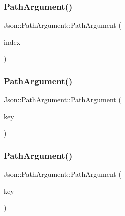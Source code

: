 \hypertarget{class_json_1_1_path_argument_a53c5b27143b161301b95fd544c139ecf}{}\label{class_json_1_1_path_argument_a53c5b27143b161301b95fd544c139ecf} 
\subsubsection{\texorpdfstring{Path\+Argument()}{PathArgument()}\hspace{0.1cm}{\footnotesize\ttfamily [6/8]}}
{\footnotesize\ttfamily Json\+::\+Path\+Argument\+::\+Path\+Argument (\begin{DoxyParamCaption}\item[{\hyperlink{namespace_json_a8048e741f2177c3b5d9ede4a5b8c53c2}{Array\+Index}}]{index }\end{DoxyParamCaption})}

\hypertarget{class_json_1_1_path_argument_a9690417a8a40e6e49f2acdf6c9281345}{}\label{class_json_1_1_path_argument_a9690417a8a40e6e49f2acdf6c9281345} 
\subsubsection{\texorpdfstring{Path\+Argument()}{PathArgument()}\hspace{0.1cm}{\footnotesize\ttfamily [7/8]}}
{\footnotesize\ttfamily Json\+::\+Path\+Argument\+::\+Path\+Argument (\begin{DoxyParamCaption}\item[{const char $\ast$}]{key }\end{DoxyParamCaption})}

\hypertarget{class_json_1_1_path_argument_ac15f25452124fbf21218897113015301}{}\label{class_json_1_1_path_argument_ac15f25452124fbf21218897113015301} 
\subsubsection{\texorpdfstring{Path\+Argument()}{PathArgument()}\hspace{0.1cm}{\footnotesize\ttfamily [8/8]}}
{\footnotesize\ttfamily Json\+::\+Path\+Argument\+::\+Path\+Argument (\begin{DoxyParamCaption}\item[{const \hyperlink{config_8h_a1e723f95759de062585bc4a8fd3fa4be}{J\+S\+O\+N\+C\+P\+P\+\_\+\+S\+T\+R\+I\+NG} \&}]{key }\end{DoxyParamCaption})}



